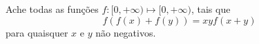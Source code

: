 Ache todas as funções $f:[0,+\infty) \mapsto [0,+\infty)$, tais que $$f(f(x)+f(y))=xyf(x+y)$$ para quaisquer $x$ e $y$ não negativos.
